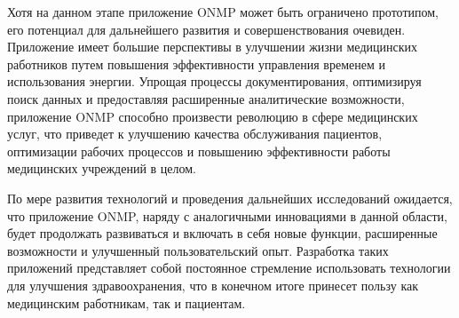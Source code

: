 Хотя на данном этапе приложение ONMP может быть ограничено прототипом, его потенциал для дальнейшего развития и совершенствования очевиден. Приложение имеет большие перспективы в улучшении жизни медицинских работников путем повышения эффективности управления временем и использования энергии. Упрощая процессы документирования, оптимизируя поиск данных и предоставляя расширенные аналитические возможности, приложение ONMP способно произвести революцию в сфере медицинских услуг, что приведет к улучшению качества обслуживания пациентов, оптимизации рабочих процессов и повышению эффективности работы медицинских учреждений в целом.

По мере развития технологий и проведения дальнейших исследований ожидается, что приложение ONMP, наряду с аналогичными инновациями в данной области, будет продолжать развиваться и включать в себя новые функции, расширенные возможности и улучшенный пользовательский опыт. Разработка таких приложений представляет собой постоянное стремление использовать технологии для улучшения здравоохранения, что в конечном итоге принесет пользу как медицинским работникам, так и пациентам.